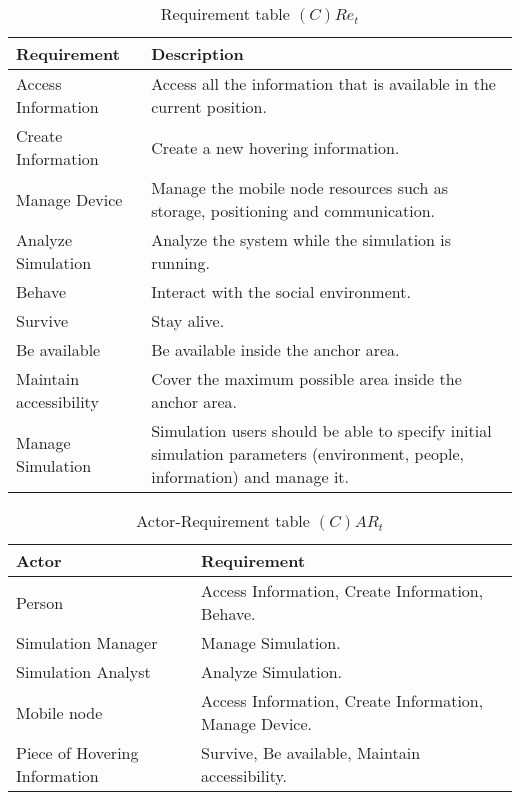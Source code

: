 \begin{table}[H]
	\centering
	\begin{tabular}{|p{4cm}|p{8cm}|}
			\hline
			\textbf{Requirement} & \textbf{Description} \\
			\hline
			Access Information & Access all the information that is available in the
			current position. \\
			\hline
			Create Information & Create a new hovering information. \\
			\hline
			Manage Device & Manage the mobile node resources such as storage,
			positioning and communication.  \\
			\hline
			Analyze Simulation & Analyze the system while the simulation is running.
			\\
			\hline
			Behave & Interact with the social environment. \\
			\hline
			Survive & Stay alive. \\
			\hline
			Be available & Be available inside the anchor area. \\
			\hline
			Maintain accessibility & Cover the maximum possible area inside the
			anchor area. \\
			\hline
			Manage Simulation & Simulation users should be able to specify initial
			simulation parameters (environment, people, information) and manage it.
			\\
			\hline
		\end{tabular}
	\caption{Requirement table $(C)Re_t$}
	\label{tab:cact}
\end{table}

\begin{table}[H]
	\centering
	\begin{tabular}{|p{4cm}|p{8cm}|}
			\hline
			\textbf{Actor} & \textbf{Requirement} \\
			\hline
			Person & Access Information, Create Information, Behave. \\
			\hline
			Simulation Manager & Manage Simulation. \\
			\hline
			Simulation Analyst & Analyze Simulation. \\
			\hline
			Mobile node & Access Information, Create Information, Manage Device. \\
			\hline
			Piece of Hovering Information & Survive, Be available, Maintain
			accessibility. \\
			\hline
		\end{tabular}
	\caption{Actor-Requirement table $(C)AR_t$}
	\label{tab:cart}
\end{table}

